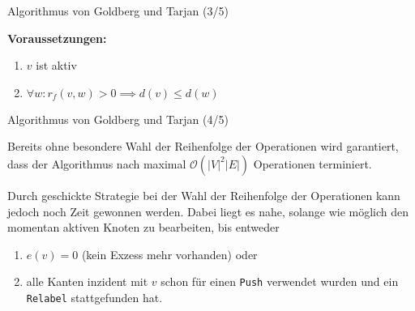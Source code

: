 \documentclass[aspectratio=169]{beamer}
\begin{document}
\begin{frame}{Algorithmus von Goldberg und Tarjan (3/5)}

  \begin{algorithmus*}
    \begin{algorithm}[H]
      \begin{algorithmic}[1]
          \EndProcedure
      \end{algorithmic}
      \textbf{Voraussetzungen:} 
        \begin{enumerate}
          \item $v$ ist aktiv
          \item $\forall w: r_f(v,w) > 0 \implies d(v) \leq d(w)$
        \end{enumerate}
    \end{algorithm}
  \end{algorithmus*}
  
\end{frame}

\begin{frame}{Algorithmus von Goldberg und Tarjan (4/5)}

  Bereits ohne besondere Wahl der Reihenfolge
  der Operationen wird garantiert, dass der Algorithmus
  nach maximal $\mathcal{O}(|V|^2|E|)$ Operationen terminiert.

  Durch geschickte Strategie bei der Wahl der Reihenfolge der
  Operationen kann jedoch noch Zeit gewonnen werden.
  Dabei liegt es nahe, solange wie möglich den momentan aktiven
  Knoten zu bearbeiten, bis entweder

  \begin{enumerate}
    \item $e(v) = 0$ (kein Exzess mehr vorhanden) oder
    \item alle Kanten inzident mit $v$ schon für einen \texttt{Push} verwendet wurden
    und ein \texttt{Relabel} stattgefunden hat. 
  \end{enumerate}
  
\end{frame}
\end{document}
